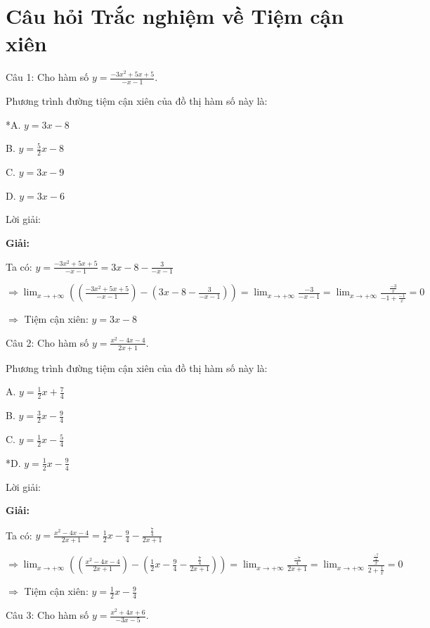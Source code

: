 \documentclass[a4paper,12pt]{article}
\begin{document}
\section*{Câu hỏi Trắc nghiệm về Tiệm cận xiên}

Câu 1: Cho hàm số \(y = \frac{-3x^{2} + 5x + 5}{-x - 1}\).

Phương trình đường tiệm cận xiên của đồ thị hàm số này là:

*A. \(y = 3x - 8\)

B. \(y = \frac{5}{2}x - 8\)

C. \(y = 3x - 9\)

D. \(y = 3x - 6\)

Lời giải:

\textbf{Giải:}

Ta có: \(y = \frac{-3x^{2} + 5x + 5}{-x - 1} = 3x - 8 - \frac{3}{-x - 1}\)

\(\Rightarrow \displaystyle\lim_{x \to +\infty} \left(\left(\frac{-3x^{2} + 5x + 5}{-x - 1}\right) - \left(3x - 8 - \frac{3}{-x - 1}\right)\right) = \displaystyle\lim_{x \to +\infty} \frac{-3}{-x - 1} = \displaystyle\lim_{x \to +\infty} \frac{\frac{-3}{x}}{-1 + \frac{-1}{x}} = 0\)

\(\Rightarrow\) Tiệm cận xiên: \(y = 3x - 8\)


Câu 2: Cho hàm số \(y = \frac{x^{2} - 4x - 4}{2x + 1}\).

Phương trình đường tiệm cận xiên của đồ thị hàm số này là:

A. \(y = \frac{1}{2}x + \frac{7}{4}\)

B. \(y = \frac{3}{2}x - \frac{9}{4}\)

C. \(y = \frac{1}{2}x - \frac{5}{4}\)

*D. \(y = \frac{1}{2}x - \frac{9}{4}\)

Lời giải:

\textbf{Giải:}

Ta có: \(y = \frac{x^{2} - 4x - 4}{2x + 1} = \frac{1}{2}x - \frac{9}{4} - \frac{\frac{7}{4}}{2x + 1}\)

\(\Rightarrow \displaystyle\lim_{x \to +\infty} \left(\left(\frac{x^{2} - 4x - 4}{2x + 1}\right) - \left(\frac{1}{2}x - \frac{9}{4} - \frac{\frac{7}{4}}{2x + 1}\right)\right) = \displaystyle\lim_{x \to +\infty} \frac{\frac{-7}{4}}{2x + 1} = \displaystyle\lim_{x \to +\infty} \frac{\frac{\frac{-7}{4}}{x}}{2 + \frac{1}{x}} = 0\)

\(\Rightarrow\) Tiệm cận xiên: \(y = \frac{1}{2}x - \frac{9}{4}\)


Câu 3: Cho hàm số \(y = \frac{x^{2} + 4x + 6}{-3x - 5}\).
\end{document}
